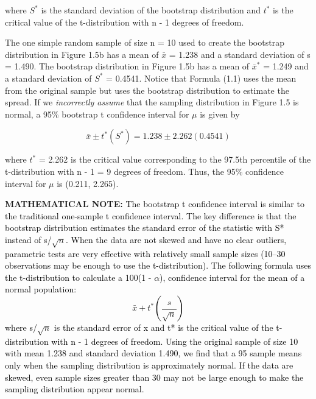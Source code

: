 \documentclass[
]{report}
\theoremstyle{definition}
\theoremstyle{definition}
\theoremstyle{definition}
\theoremstyle{definition}
\theoremstyle{remark}
\begin{document}
where \(S^*\) is the standard deviation of the bootstrap distribution and \(t^*\) is the critical value of the t-distribution with n - 1 degrees of freedom.

The one simple random sample of size n = 10 used to create the bootstrap distribution in Figure 1.5b has a mean of \(\bar{x}\) = 1.238 and a standard deviation of s = 1.490. The bootstrap distribution in Figure 1.5b has a mean of \(\bar{x}^*\) = 1.249 and a standard deviation of \(S^*\) = 0.4541. Notice that Formula (1.1) uses the mean from the original sample but uses the bootstrap distribution to estimate the spread. If we \emph{incorrectly assume} that the sampling distribution in Figure 1.5 is normal, a 95\% bootstrap t confidence interval for \(\mu\) is given by

\begin{equation} 
  \bar{x} \pm t^*\left(S^*\right) = 1.238 \pm 2.262(0.4541)
\end{equation}

where \(t^*\) = 2.262 is the critical value corresponding to the 97.5th percentile of the t-distribution with n - 1 = 9
degrees of freedom. Thus, the 95\% confidence interval for \(\mu\) is (0.211, 2.265).

\large

\textbf{MATHEMATICAL NOTE:}
\textcolor{black}{The bootstrap t confidence interval is similar to the traditional one-sample t confidence interval. The key difference
is that the bootstrap distribution estimates the standard error of the statistic with S* instead of s/$\sqrt{n}$.
When the data are not skewed and have no clear outliers, parametric tests are very effective with relatively
small sample sizes (10–30 observations may be enough to use the t-distribution). The following formula
uses the t-distribution to calculate a 100(1 - $\alpha$), confidence interval for the mean of a normal population:
\begin{equation} 
  \bar{x} + t^*\left(\frac{s}{\sqrt{n}}\right)
  \tag{1.2} \label{eq:1_2}
\end{equation} 
where s/$\sqrt{n}$ is the standard error of x and t* is the critical value of the t-distribution with n - 1 degrees
of freedom. Using the original sample of size 10 with mean 1.238 and standard deviation 1.490, we find
that a 95%
sample means only when the sampling distribution is approximately normal. If the data are skewed, even
sample sizes greater than 30 may not be large enough to make the sampling distribution appear normal.
}
\end{document}
